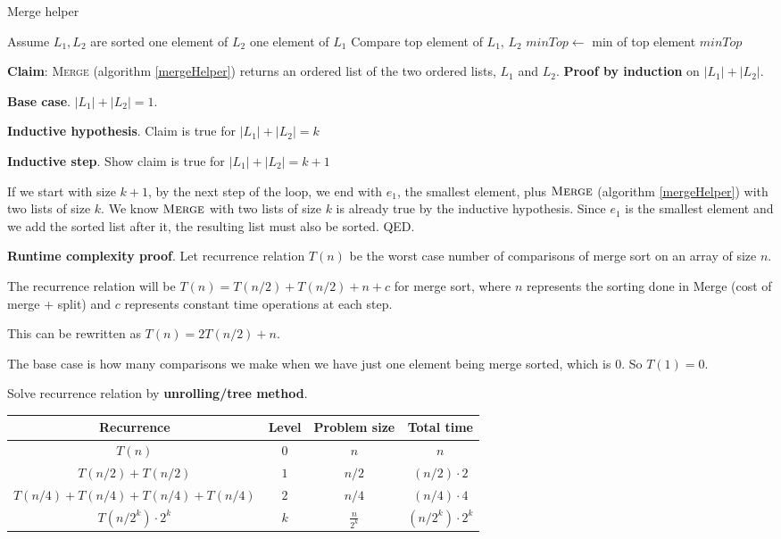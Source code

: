 \documentclass{article}
\begin{document}
\begin{algorithm}
\caption{Merge helper}\label{mergeHelper}
\begin{algorithmic}[1]
\State Assume $L_1, L_2$ are sorted
    \State \Return one element of $L_2$
    \State \Return one element of $L_1$
\Else
    \State Compare top element of $L_1$, $L_2$
    \State $minTop \gets$ min of top element
    \State \Return $minTop$
\EndIf
\EndProcedure
\end{algorithmic}
\end{algorithm}

\textbf{Claim}: \textsc{Merge} (algorithm \ref{mergeHelper}) returns an ordered list of the two ordered lists, $L_1$ and $L_2$.
\textbf{Proof by induction} on $|L_1| + |L_2|$.

\textbf{Base case}. $|L_1| + |L_2| = 1$.

\textbf{Inductive hypothesis}. Claim is true for $|L_1| + |L_2| = k$

\textbf{Inductive step}. Show claim is true for $|L_1| + |L_2| = k + 1$

If we start with size $k + 1$, by the next step of the loop, we end with $e_1$, the smallest element, plus $\textsc{Merge}$ (algorithm \ref{mergeHelper}) with two lists of size $k$. We know $\textsc{Merge}$ with two lists of size $k$ is already true by the inductive hypothesis. Since $e_1$ is the smallest element and we add the sorted list after it, the resulting list must also be sorted. QED.

\textbf{Runtime complexity proof}. Let recurrence relation $T(n)$ be the worst case number of comparisons of merge sort on an array of size $n$.

The recurrence relation will be $T(n) = T(n/2) + T(n/2) + n + c$ for merge sort, where $n$ represents the sorting done in {\sc Merge} (cost of merge + split) and $c$ represents constant time operations at each step.

This can be rewritten as $T(n) = 2T(n/2) + n$.

The base case is how many comparisons we make when we have just one element being merge sorted, which is 0. So $T(1) = 0$.

Solve recurrence relation by \textbf{unrolling/tree method}.

\begin{tabular}{|c|c|c|c|}
    \hline
    \textbf{Recurrence} & \textbf{Level} & \textbf{Problem size} & \textbf{Total time}\\ \hline
    $T(n)$ & $0$ & $n$ & $n$\\ \hline
    $T(n/2) + T(n/2)$ & $1$ & $n/2$ & $(n/2) \cdot 2$\\ \hline
    $T(n/4) + T(n/4) + T(n/4) + T(n/4)$ & $2$ & $n/4$ & $(n/4) \cdot 4$\\ \hline
    $T(n/2^k) \cdot 2^k$ & $k$ & $\frac{n}{2^k}$ & $(n/2^k) \cdot 2^k$ \\ \hline
\end{tabular}
\end{document}
